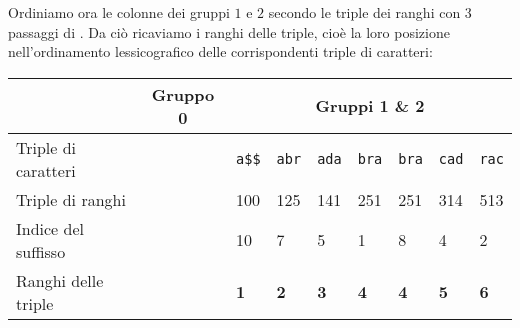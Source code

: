 \newpage

Ordiniamo ora le colonne dei gruppi \(1\) e \(2\) secondo le triple dei ranghi con
\(3\) passaggi di \radixsort. Da ci\`o ricaviamo i ranghi delle triple, cio\`e la 
loro posizione nell'ordinamento lessicografico delle corrispondenti triple di 
caratteri:
\begin{table}[H]
  \begin{tabularx}{\linewidth}{l*{11}{X}}
                        & \multicolumn{4}{c}{Gruppo 0 \cellcolor{green} } 
                        & \multicolumn{7}{c}{Gruppi 1 \& 2\cellcolor{orange} } \\
    \hline
    Triple di caratteri & \multicolumn{4}{c}{\cellcolor{gray!25}}
                        & \texttt{a\$\$} & \texttt{abr} & \texttt{ada} & \texttt{bra}
                        & \texttt{bra} & \texttt{cad} & \texttt{rac} \\
    Triple di ranghi    & \multicolumn{4}{c}{\cellcolor{gray!25}}
                        & 100 & 125 & 141 & 251
                        & 251 & 314 & 513 \\
    Indice del suffisso & \multicolumn{4}{c}{\cellcolor{gray!25}}
                        & 10 & 7 & 5 & 1
                        & 8 & 4 & 2 \\
    Ranghi delle triple & \multicolumn{4}{c}{\cellcolor{gray!25}}
                        & \textbf{1} & \textbf{2} & \textbf{3} & \textbf{4}
                        & \textbf{4} & \textbf{5} & \textbf{6} \\
  \end{tabularx}
\end{table}

